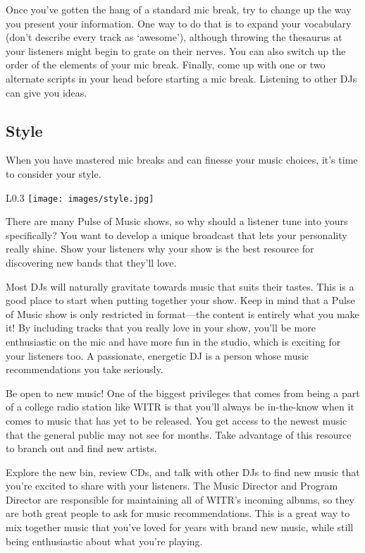 \documentclass{witrman}
\begin{document}
Once you've gotten the hang of a standard mic break, try to change up the way
you present your information.  One way to do that is to expand your vocabulary
(don't describe every track as `awesome'), although throwing the thesaurus at
your listeners might begin to grate on their nerves.  You can also switch up the
order of the elements of your mic break.  Finally, come up with one or two
alternate scripts in your head before starting a mic break.  Listening to other
DJs can give you ideas.


\subsection{Style}

When you have mastered mic breaks and can finesse your music choices, it's time
to consider your style.

\begin{wrapfigure}{L}{0.3\linewidth}
    \texttt{[image: images/style.jpg]}
\end{wrapfigure}

There are many Pulse of Music shows, so why should a listener tune into yours
specifically?  You want to develop a unique broadcast that lets your personality
really shine.  Show your listeners why your show is the best resource for
discovering new bands that they'll love.

Most DJs will naturally gravitate towards music that suits their tastes.  This
is a good place to start when putting together your show.  Keep in mind that a
Pulse of Music show is only restricted in format---the content is entirely what
you make it!  By including tracks that you really love in your show, you'll be
more enthusiastic on the mic and have more fun in the studio, which is exciting
for your listeners too.  A passionate, energetic DJ is a person whose music
recommendations you take seriously.

Be open to new music!  One of the biggest privileges that comes from being a
part of a college radio station like WITR is that you'll always be in-the-know
when it comes to music that has yet to be released.  You get access to the
newest music that the general public may not see for months.  Take advantage of
this resource to branch out and find new artists.

Explore the new bin, review CDs, and talk with other DJs to find new music that
you're excited to share with your listeners.   The Music Director and Program
Director are responsible for maintaining all of WITR's incoming albums, so they
are both great people to ask for music recommendations.  This is a great way to
mix together music that you've loved for years with brand new music, while still
being enthusiastic about what you're playing.
\end{document}
